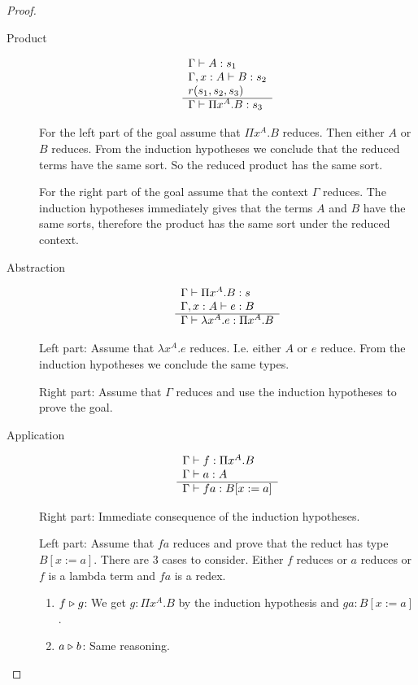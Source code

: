 \begin{theorem}
\begin{proof}
\begin{description}
    \item[Product]
      $$
      \begin{array}{l}  \Gamma \vdash A:s_1
        \\
        \Gamma,x:A \vdash B: s_2
        \\
        r(s_1,s_2,s_3) \\ \hline \Gamma \vdash \Pi x^A. B : s_3\end{array}
      $$

      For the left part of the goal assume that $\Pi x^A. B$ reduces. Then
      either  $A$ or $B$ reduces. From the induction hypotheses we conclude
      that the reduced terms have the same sort. So the reduced product has the
      same sort.

      For the right part of the goal assume that the context $\Gamma$
      reduces. The induction hypotheses immediately gives that the terms $A$
      and $B$ have the same sorts, therefore the product has the same sort
      under the reduced context.

    \item[Abstraction]
      $$
      \begin{array}{l}  \Gamma \vdash \Pi x^A. B : s
        \\
        \Gamma,x:A \vdash e: B
       \\ \hline \Gamma \vdash \lambda x^A. e : \Pi x^A. B\end{array}
      $$

      Left part: Assume that $\lambda x^A. e$ reduces. I.e. either $A$ or $e$
      reduce. From the induction hypotheses we conclude the same types.

      Right part: Assume that $\Gamma$ reduces and use the induction
      hypotheses to prove the goal.


    \item[Application]
      $$
      \begin{array}{l}  \Gamma \vdash f : \Pi x^A. B
        \\
        \Gamma \vdash a: A
       \\ \hline \Gamma \vdash f a : B[x:=a]\end{array}
      $$

      Right part: Immediate consequence of the induction hypotheses.

      Left part: Assume that $f a$ reduces and prove that the reduct has type
      $B[x:=a]$. There are 3 cases to consider. Either $f$ reduces or $a$
      reduces or $f$ is a lambda term and $f a$ is a redex.
      \begin{enumerate}

      \item $f \mathrel{\triangleright} g$: We get $g: \Pi x^A. B$ by the induction hypothesis
        and $g a : B[x:=a]$.

      \item $a \mathrel{\triangleright} b$: Same reasoning.


\end{enumerate}
\end{description}
\end{proof}
\end{theorem}
